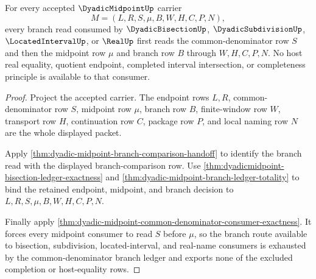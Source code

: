 \begin{theorem}
\label{thm:dyadic-midpoint-common-denominator-branch-exhaustion}
For every accepted $\DyadicMidpointUp$ carrier
$$
M=(L,R,S,\mu,B,W,H,C,P,N),
$$
every branch read consumed by $\DyadicBisectionUp$, $\DyadicSubdivisionUp$, $\LocatedIntervalUp$, or $\RealUp$ first reads the common-denominator row $S$ and then the midpoint row $\mu$ and branch row $B$ through $W,H,C,P,N$. No host real equality, quotient endpoint, completed interval intersection, or completeness principle is available to that consumer.
\end{theorem}
\begin{proof}
Project the accepted carrier. The endpoint rows $L,R$, common-denominator row $S$, midpoint row $\mu$, branch row $B$, finite-window row $W$, transport row $H$, continuation row $C$, package row $P$, and local naming row $N$ are the whole displayed packet.

Apply \autoref{thm:dyadic-midpoint-branch-comparison-handoff} to identify the branch read with the displayed branch-comparison row. Use \autoref{thm:dyadicmidpoint-bisection-ledger-exactness} and \autoref{thm:dyadic-midpoint-branch-ledger-totality} to bind the retained endpoint, midpoint, and branch decision to $L,R,S,\mu,B,W,H,C,P,N$.

Finally apply \autoref{thm:dyadic-midpoint-common-denominator-consumer-exactness}. It forces every midpoint consumer to read $S$ before $\mu$, so the branch route available to bisection, subdivision, located-interval, and real-name consumers is exhausted by the common-denominator branch ledger and exports none of the excluded completion or host-equality rows.
\end{proof}

